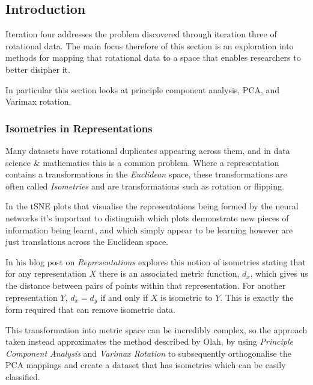\documentclass[a4paper,11pt,titlepage]{article}
\begin{document}
	\subsection{Introduction}
	Iteration four addresses the problem discovered through iteration three of rotational data. The main focus therefore of this section is an exploration into methods for mapping that rotational data to a space that enables researchers to better disipher it. 
	\par 
	In particular this section looks at principle component analysis, PCA, and Varimax rotation. 

	\subsubsection{Isometries in Representations}
	Many datasets have rotational duplicates appearing across them, and in data science \& mathematics this is a common problem. Where a representation contains a transformations in the \textit{Euclidean} space, these transformations are often called \textit{Isometries} and are transformations such as rotation or flipping. 
	\par 
	In the tSNE plots that visualise the representations being formed by the neural networks it's important to distinguish which plots demonstrate new pieces of information being learnt, and which simply appear to be learning however are just translations across the Euclidean space.
	\par 
	In his blog post on \textit{Representations} \cite{Olah2014} explores this notion of isometries stating that for any representation $ X $ there is an associated metric function, $ d_{x} $, which gives us the distance between pairs of points within that representation. For another representation $ Y $, $ d_{x} = d_{y} $ if and only if $ X $ is isometric to $ Y $. This is exactly the form required that can remove isometric data.
		\par 
		This transformation into metric space can be incredibly complex, so the approach taken instead approximates the method described by Olah, by using \textit{Principle Component Analysis} and \textit{Varimax Rotation} to subsequently orthogonalise the PCA mappings and create a dataset that has isometries which can be easily classified.
		
\end{document}

